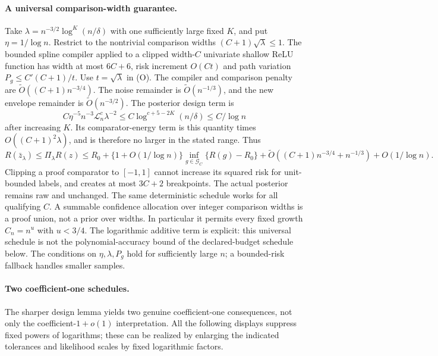 \paragraph{A universal comparison-width guarantee.}
Take $\lambda=n^{-3/2}\log^K(n/\delta)$ with one sufficiently large
fixed $K$, and put $\eta=1/\log n$. Restrict to the nontrivial
comparison widths $(C+1)\sqrt\lambda\le1$.
The bounded spline compiler applied to a clipped width-$C$ univariate
shallow ReLU function has width at most $6C+6$, risk increment
$O(Ct)$ and path variation $P_g\le C'(C+1)/t$.
Use $t=\sqrt\lambda$ in (O). The compiler and comparison penalty
are $\widetilde O((C+1)n^{-3/4})$. The noise remainder is
$\widetilde O(n^{-1/3})$, and the new envelope remainder is
$\widetilde O(n^{-3/2})$.
The posterior design term is
\[
 C\eta^{-5}n^{-3}\mathcal L_n^c\lambda^{-2}
 \le C\log^{c+5-2K}(n/\delta)\le C/\log n
\]
after increasing $K$. Its comparator-energy term is this quantity
times $O((C+1)^2\lambda)$, and is therefore no larger in the
stated range. Thus
\[
 R(\bar z_\lambda)\le\Pi_\lambda R(z)
 \le R_0+\{1+O(1/\log n)\}
       \inf_{g\in\mathcal G_C}\{R(g)-R_0\}
 +\widetilde O((C+1)n^{-3/4}+n^{-1/3})+O(1/\log n).
 \tag{C}
\]
Clipping a proof comparator to $[-1,1]$ cannot increase its squared
risk for unit-bounded labels, and creates at most $3C+2$ breakpoints.
The actual posterior remains raw and unchanged.
The same deterministic schedule works for all qualifying $C$.
A summable confidence allocation over integer comparison widths is
a proof union, not a prior over widths. In particular it permits
every fixed growth $C_n=n^u$ with $u<3/4$.
The logarithmic additive term is explicit: this universal schedule
is not the polynomial-accuracy bound of the declared-budget schedule
below. The conditions on $\eta,\lambda,P_g$ hold for sufficiently
large $n$; a bounded-risk fallback handles smaller samples.

\paragraph{Two coefficient-one schedules.}
The sharper design lemma yields two genuine coefficient-one
consequences, not only the coefficient-$1+o(1)$ interpretation.
All the following displays suppress fixed powers of logarithms;
these can be realized by enlarging the indicated tolerances and
likelihood scales by fixed logarithmic factors.

